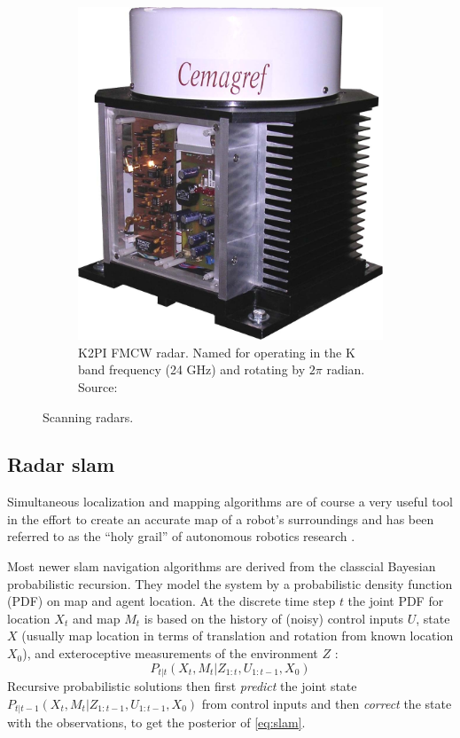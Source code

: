 \begin{figure}[htbp]
\begin{subfigure}[t]{0.3\textwidth}
        \includegraphics[max width=\linewidth]{gfx/pictures/k2pi}
        \caption{K2PI FMCW radar. Named for operating in the K band frequency (24 GHz) and rotating by $2\pi$ radian. Source: \cite{Rouveure2008}}
        \label{fig:k2pi}
    \end{subfigure}
    \caption{Scanning radars.}
\end{figure}


\subsection{Radar slam}\label{radar-slam}


Simultaneous localization and mapping algorithms are of course a very useful tool in the effort to create an accurate map of a robot's surroundings and has been referred to as the ``holy grail'' of autonomous robotics research \cite{Dissanayake2001}.

Most newer slam navigation algorithms are derived from the classcial Bayesian probabilistic recursion. They model the system by a probabilistic density function (PDF) on map and agent location. At the discrete time step $t$ the joint PDF for location $X_t$ and map $M_t$ is based on the history of (noisy) control inputs $U$, state $X$ (usually map location in terms of translation and rotation from known location $X_0$), and exteroceptive measurements of the environment $Z$ \cite{Adams2012}:
\begin{equation} \label{eq:slam}
    P_{t|t}(X_t,M_t|Z_{1:t},U_{1:t-1},X_0)
\end{equation}
Recursive probabilistic solutions then first \textit{predict} the joint state \( P_{t|t-1}(X_t,M_t|Z_{1:t-1},U_{1:t-1},X_0) \) from control inputs and then \textit{correct} the state with the observations, to get the posterior of \cref{eq:slam}.

